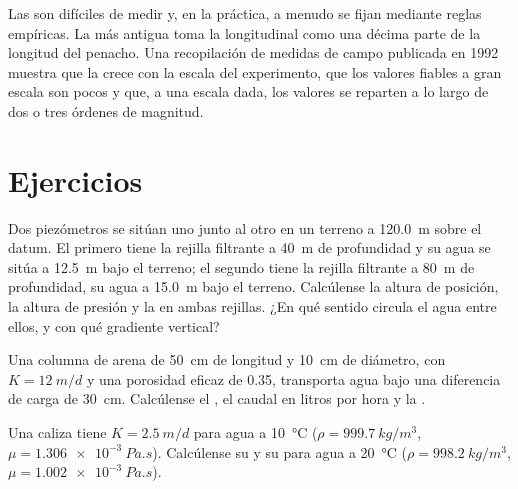 Las  son difíciles de medir y, en la práctica, a menudo se fijan mediante
reglas empíricas. La más antigua toma la  longitudinal como una décima parte de
la longitud del penacho. Una recopilación de medidas de campo publicada en
1992 muestra que la  crece con la escala del experimento,
que los valores fiables a gran escala son pocos y que, a una escala dada, los
valores se reparten a lo largo de dos o tres órdenes de magnitud.

\section{Ejercicios}

\begin{exercise}[$\star$]\label{exo:b3:hydrogeology:1}
Dos piezómetros se sitúan uno junto al otro en un terreno a \qty{120.0}{m} sobre el
datum. El primero tiene la rejilla filtrante a \qty{40}{m} de profundidad y su agua se sitúa
a \qty{12.5}{m} bajo el terreno; el segundo tiene la rejilla filtrante a \qty{80}{m}
de profundidad, su agua a \qty{15.0}{m} bajo el terreno. Calcúlense la altura
de posición, la altura de presión y la  en ambas rejillas. ¿En qué sentido circula el
agua entre ellos, y con qué gradiente vertical?
\end{exercise}

\begin{exercise}[$\star$]\label{exo:b3:hydrogeology:2}
Una columna de arena de \qty{50}{cm} de longitud y \qty{10}{cm} de diámetro, con $K =
\qty{12}{m/d}$ y una porosidad eficaz de 0.35, transporta agua bajo una
diferencia de carga de \qty{30}{cm}. Calcúlense el , el caudal
en litros por hora y la .
\end{exercise}

\begin{exercise}[$\star$]\label{exo:b3:hydrogeology:3}
Una caliza tiene $K = \qty{2.5}{m/d}$ para agua a \qty{10}{\celsius}
($\rho = \qty{999.7}{kg/m^3}$, $\mu = \qty{1.306e-3}{Pa.s}$). Calcúlense su
 y su  para agua a
\qty{20}{\celsius} ($\rho = \qty{998.2}{kg/m^3}$, $\mu =
\qty{1.002e-3}{Pa.s}$).
\end{exercise}

